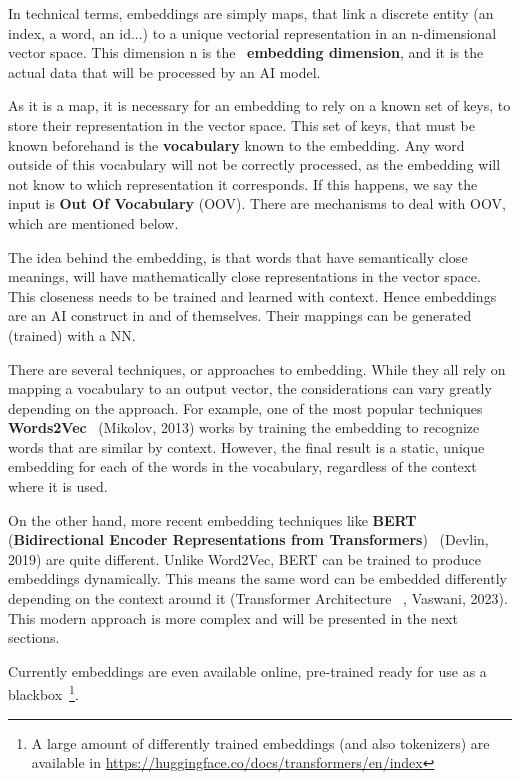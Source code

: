 \documentclass[a4paper, 11pt]{report}
\begin{document}
In technical terms, embeddings are simply maps, that link a discrete entity (an index, a word, an id...) to a unique vectorial representation in an n-dimensional vector space. This dimension n is the ~\textbf{embedding dimension}, and it is the actual data that will be processed by an AI model.

As it is a map, it is necessary for an embedding to rely on a known set of keys, to store their representation in the vector space. This set of keys, that must be known beforehand is the \textbf{vocabulary} known to the embedding. Any word outside of this vocabulary will not be correctly processed, as the embedding will not know to which representation it corresponds. If this happens, we say the input is \textbf{Out Of Vocabulary} (OOV). There are mechanisms to deal with OOV, which are mentioned below.

The idea behind the embedding, is that words that have semantically close meanings, will have mathematically close representations in the vector space. This closeness needs to be trained and learned with context. Hence embeddings are an AI construct in and of themselves. Their mappings can be generated (trained) with a NN.

There are several techniques, or approaches to embedding. While they all rely on mapping a vocabulary to an output vector, the considerations can vary greatly depending on the approach. For example, one of the most popular techniques \textbf{Words2Vec}~\cite{Mikolov2013_Efficient} (Mikolov, 2013) works by training the embedding to recognize words that are similar by context. However, the final result is a static, unique embedding for each of the words in the vocabulary, regardless of the context where it is used.

On the other hand, more recent embedding techniques like \textbf{BERT} (\textbf{Bidirectional Encoder Representations from Transformers})~\cite{Devlin2019_Bert} (Devlin, 2019) are quite different. Unlike Word2Vec, BERT can be trained to produce embeddings dynamically. This means the same word can be embedded differently depending on the context around it (Transformer Architecture ~\cite{vaswani2023_Attention}, Vaswani, 2023). This modern approach is more complex and will be presented in the next sections.

Currently embeddings are even available online, pre-trained ready for use as a blackbox~\footnote{A large amount of differently trained embeddings (and also tokenizers) are available in \url{https://huggingface.co/docs/transformers/en/index}}.
\end{document}
